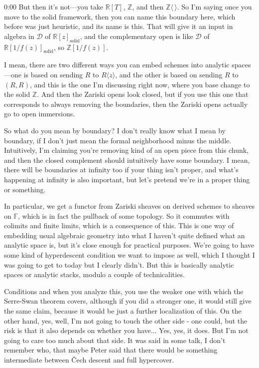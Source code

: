 \begin{unfinished}{0:00}
But then it's not---you take $\mathbb{R}[T]$, $\mathbb{Z}$, and then $\mathbb{Z}\langle\,\rangle$. So I'm saying once you move to the solid framework, then you can name this boundary here, which before was just heuristic, and its name is this. That will give it an input in algebra in $\mathcal{D}$ of $\mathbb{R}[z]_{\text{solid}}$, and the complementary open is like $\mathcal{D}$ of $\mathbb{R}[1/f(z)]_{\text{solid}}$, so $\mathbb{Z}[1/f(z)]$.

I mean, there are two different ways you can embed schemes into analytic spaces---one is based on sending $R$ to $R\langle z\rangle$, and the other is based on sending $R$ to $(R, R)$, and this is the one I'm discussing right now, where you base change to the solid $\mathbb{Z}$. And then the Zariski opens look closed, but if you use this one that corresponds to always removing the boundaries, then the Zariski opens actually go to open immersions.

So what do you mean by boundary? I don't really know what I mean by boundary, if I don't just mean the formal neighborhood minus the middle. Intuitively, I'm claiming you're removing kind of an open piece from this chunk, and then the closed complement should intuitively have some boundary. I mean, there will be boundaries at infinity too if your thing isn't proper, and what's happening at infinity is also important, but let's pretend we're in a proper thing or something.

In particular, we get a functor from Zariski sheaves on derived schemes to sheaves on $\mathbb{F}$, which is in fact the pullback of some topology. So it commutes with colimits and finite limits, which is a consequence of this. This is one way of embedding usual algebraic geometry into what I haven't quite defined what an analytic space is, but it's close enough for practical purposes. We're going to have some kind of hyperdescent condition we want to impose as well, which I thought I was going to get to today but I clearly didn't. But this is basically analytic spaces or analytic stacks, modulo a couple of technicalities.

Conditions and when you analyze this, you use the weaker one with which the Serre-Swan theorem covers, although if you did a stronger one, it would still give the same claim, because it would be just a further localization of this. On the other hand, yes, well, I'm not going to touch the other side - one could, but the risk is that it also depends on whether you have... Yes, yes, it does. But I'm not going to care too much about that side. It was said in some talk, I don't remember who, that maybe Peter said that there would be something intermediate between Čech descent and full hypercover.


\end{unfinished}
